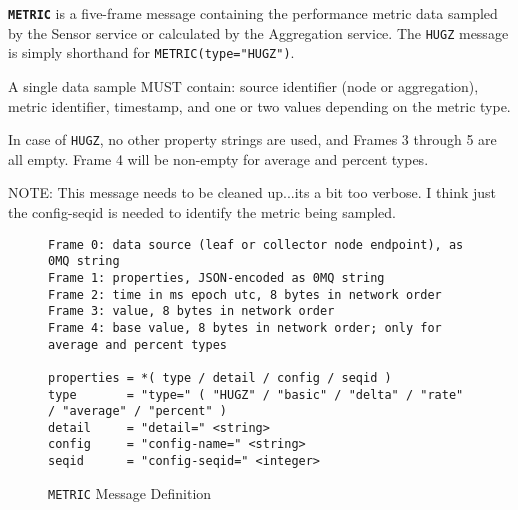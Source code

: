 \textbf{\texttt{METRIC}} is a five-frame message containing the performance metric data sampled by the Sensor service or
calculated by the Aggregation service. The \texttt{HUGZ} message is simply shorthand for \texttt{METRIC(type="HUGZ")}.

A single data sample MUST contain: source identifier (node or aggregation), metric identifier, timestamp, and one or two
values depending on the metric type.

In case of \texttt{HUGZ}, no other property strings are used, and Frames 3 through 5 are all empty. Frame 4 will be
non-empty for average and percent types.

NOTE: This message needs to be cleaned up...its a bit too verbose. I think just the config-seqid is needed to identify
      the metric being sampled.

\begin{figure}[H]
\vspace{+10pt}
\begin{verbatim}
Frame 0: data source (leaf or collector node endpoint), as 0MQ string
Frame 1: properties, JSON-encoded as 0MQ string
Frame 2: time in ms epoch utc, 8 bytes in network order
Frame 3: value, 8 bytes in network order
Frame 4: base value, 8 bytes in network order; only for average and percent types

properties = *( type / detail / config / seqid )
type       = "type=" ( "HUGZ" / "basic" / "delta" / "rate" / "average" / "percent" )
detail     = "detail=" <string>
config     = "config-name=" <string>
seqid      = "config-seqid=" <integer>
\end{verbatim}
\vspace{-20pt}
\caption{\texttt{METRIC} Message Definition}
\label{fig:message_metric}
\end{figure}
